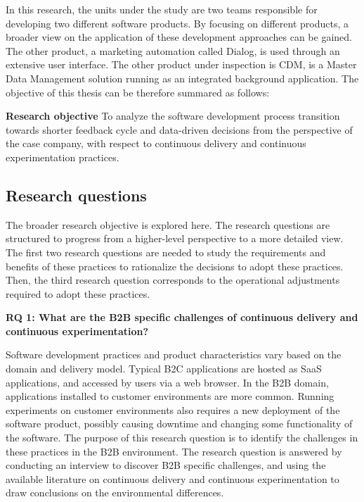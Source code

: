 \documentclass[english]{tktltiki2}
\theoremstyle{definition}
\theoremstyle{remark}
\begin{document}
In this research, the units under the study are two teams responsible for developing two different software products. By focusing on different products, a broader view on the application of these development approaches can be gained. The other product, a marketing automation called Dialog, is used through an extensive user interface. The other product under inspection is CDM, is a Master Data Management \cite{loshin2010master} solution running as an integrated background application. The objective of this thesis can be therefore summared as follows:

\bigskip
\noindent \textbf{Research objective}
To analyze the software development process transition towards shorter feedback cycle and data-driven decisions from the perspective of the case company, with respect to continuous delivery and continuous experimentation practices.

\subsection{Research questions}

The broader research objective is explored here. The research questions are structured to progress from a higher-level perspective to a more detailed view. The first two research questions are needed to study the requirements and benefits of these practices to rationalize the decisions to adopt these practices. Then, the third research question corresponds to the operational adjustments required to adopt these practices. \newline

\noindent \textbf{RQ 1: What are the B2B specific challenges of continuous delivery and continuous experimentation?}

\noindent Software development practices and product characteristics vary based on the domain and delivery model. Typical B2C applications are hosted as SaaS applications, and accessed by users via a web browser. In the B2B domain, applications installed to customer environments are more common. Running experiments on customer environments also requires a new deployment of the software product, possibly causing downtime and changing some functionality of the software. The purpose of this research question is to identify the challenges in these practices in the B2B environment. The research question is answered by conducting an interview to discover B2B specific challenges, and using the available literature on continuous delivery and continuous experimentation to draw conclusions on the environmental differences.
\newline
\end{document}
